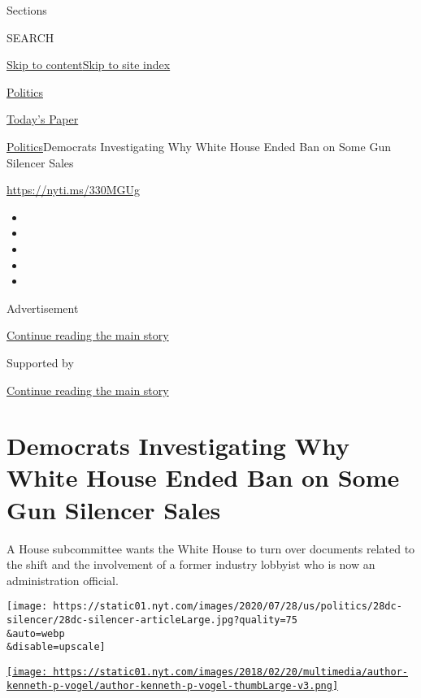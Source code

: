 Sections

SEARCH

\protect\hyperlink{site-content}{Skip to
content}\protect\hyperlink{site-index}{Skip to site index}

\href{https://www.nytimes.com/section/politics}{Politics}

\href{https://myaccount.nytimes.com/auth/login?response_type=cookie\&client_id=vi}{}

\href{https://www.nytimes.com/section/todayspaper}{Today's Paper}

\href{/section/politics}{Politics}\textbar{}Democrats Investigating Why
White House Ended Ban on Some Gun Silencer Sales

\url{https://nyti.ms/330MGUg}

\begin{itemize}
\item
\item
\item
\item
\item
\end{itemize}

Advertisement

\protect\hyperlink{after-top}{Continue reading the main story}

Supported by

\protect\hyperlink{after-sponsor}{Continue reading the main story}

\hypertarget{democrats-investigating-why-white-house-ended-ban-on-some-gun-silencer-sales}{%
\section{Democrats Investigating Why White House Ended Ban on Some Gun
Silencer
Sales}\label{democrats-investigating-why-white-house-ended-ban-on-some-gun-silencer-sales}}

A House subcommittee wants the White House to turn over documents
related to the shift and the involvement of a former industry lobbyist
who is now an administration official.

\texttt{[image: https://static01.nyt.com/images/2020/07/28/us/politics/28dc-silencer/28dc-silencer-articleLarge.jpg?quality=75\\\&auto=webp\\\&disable=upscale]}

\href{https://www.nytimes.com/by/kenneth-p-vogel}{\texttt{[image: https://static01.nyt.com/images/2018/02/20/multimedia/author-kenneth-p-vogel/author-kenneth-p-vogel-thumbLarge-v3.png]}}

